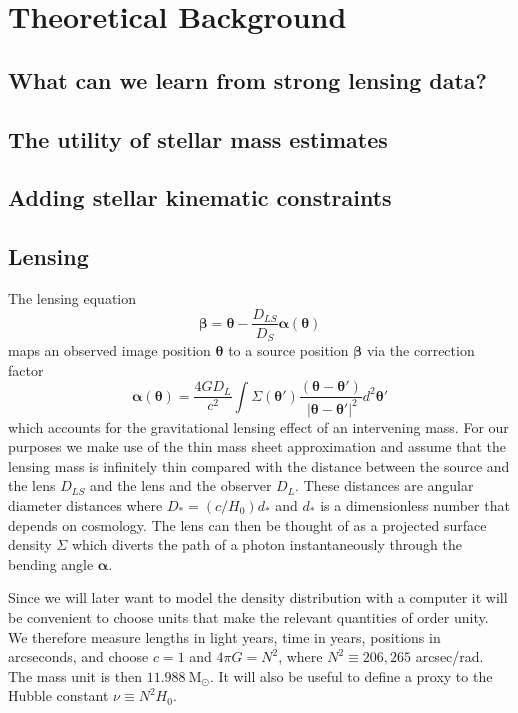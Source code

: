\documentclass[galley]{mn2e}
\newcommand{\Msun}{\ensuremath{\mathrm{M}_\odot}}
\renewcommand{\vec}[1]{\ensuremath{\boldsymbol{#1}}}
\begin{document}
\section{Theoretical Background}\label{sec:theory}

\subsection{What can we learn from strong lensing data?} 

\subsection{The utility of stellar mass estimates} 

\subsection{Adding stellar kinematic constraints} 




\subsection{Lensing}

The lensing equation
%
\begin{equation}
\vec\beta = \vec\theta - \frac{D_{LS}}{D_S}\vec\alpha(\vec\theta)
\label{lensing equation}
\end{equation}
%
maps an observed image position $\vec\theta$ to a source position $\vec\beta$
via the correction factor 
%
\begin{equation}
\vec\alpha(\vec\theta) = \frac{4GD_L}{c^2} \int \Sigma(\vec\theta')\frac{(\vec\theta - \vec\theta')}{\ |\vec\theta - \vec\theta'|^2}d^2\vec\theta'
\end{equation}
%
which accounts for the gravitational lensing effect of an intervening mass. For
our purposes we make use of the thin mass sheet approximation and assume that
the lensing mass is infinitely thin compared with the distance between the
source and the lens $D_{LS}$ and the lens and the observer $D_{L}$. These
distances are angular diameter distances where $D_* = (c/H_0)d_*$ and $d_*$ is
a dimensionless number that depends on cosmology.  The lens can then be thought
of as a projected surface density $\Sigma$ which diverts the path of a photon
instantaneously through the bending angle $\vec\alpha$.

Since we will later want to model the density distribution with a computer it will
be convenient to choose units that make the relevant quantities of order unity.
We therefore measure lengths in light years, time in years, positions in
arcseconds, and choose $c=1$ and $4\pi G = N^2$, where $N^2 \equiv 206,265$
arcsec/rad. The mass unit is then $11.988\ \Msun$. It will also be useful to 
define a proxy to the Hubble constant $\nu \equiv N^2 H_0$.
\end{document}
